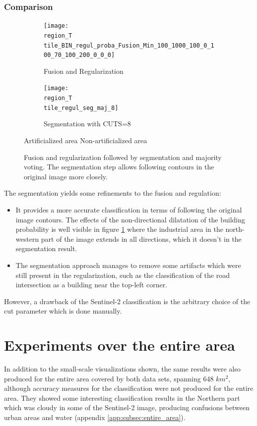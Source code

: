 \documentclass[10pt]{article}
\newcommand{\legendebin}{\vspace{3mm}
    
    \small\centering
    \fcolorbox{black}{red}{\rule{0pt}{6pt}\rule{6pt}{0pt}}\quad Artificialized area 
    \fcolorbox{black}{green}{\rule{0pt}{6pt}\rule{6pt}{0pt}}\quad Non-artificialized area
    }
\newcommand{\tile}{41000_30000}
\newcommand{\region}{finistere}
\begin{document}
\subsubsection{Comparison}
\begin{figure}[H]
    \centering
    \begin{subfigure}{0.49\textwidth}
        \centering
        \texttt{[image: \\region\_T\\tile\_BIN\_regul\_proba\_Fusion\_Min\_100\_1000\_100\_0\_100\_70\_100\_200\_0\_0\_0]}
        \caption{Fusion and Regularization}
        \label{subfig:fusionRegComp}
    \end{subfigure}
    \begin{subfigure}{0.49\textwidth}
        \centering
        \texttt{[image: \\region\_T\\tile\_regul\_seg\_maj\_8]}
        \caption{Segmentation with CUTS=8}
    \end{subfigure}
    \legendebin
    \caption{Fusion and regularization followed by segmentation and majority voting. The segmentation step allows following contours in the original image more closely.}
    \label{fig:comparison}
\end{figure}
The segmentation yields some refinements to the fusion and regulation:
\begin{itemize}
    \item It provides a more accurate classification in terms of following the original image contours. The effects of the non-directional dilatation of the building probability is well visible in figure \ref{subfig:fusionRegComp} where the industrial area in the north-western part of the image extends in all directions, which it doesn't in the segmentation result.
    \item The segmentation approach manages to remove some artifacts which were still present in the regularization, such as the classification of the road intersection as a building near the top-left corner.
\end{itemize}
However, a drawback of the Sentinel-2 classification is the arbitrary choice of the cut parameter which is done manually.


\section{Experiments over the entire area}
In addition to the small-scale visualizations shown, the same results were also produced for the entire area covered by both data sets, spanning 648 $km^2$, although accuracy measures for the classification were not produced for the entire area. They showed some interesting classification results in the Northern part which was cloudy in some of the Sentinel-2 image, producing confusions between urban areas and water (appendix \ref{app:subsec:entire_area}).
\end{document}

